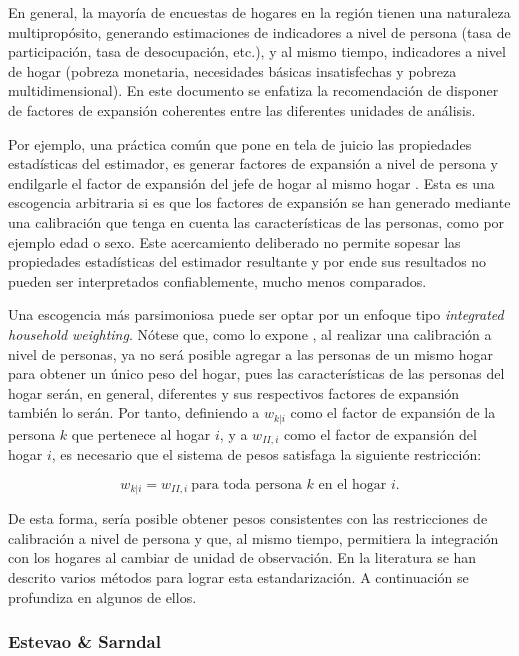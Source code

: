 \documentclass[
  12pt,
  spanish,
]{book}
\begin{document}
En general, la mayoría de encuestas de hogares en la región tienen una naturaleza multipropósito, generando estimaciones de indicadores a nivel de persona (tasa de participación, tasa de desocupación, etc.), y al mismo tiempo, indicadores a nivel de hogar (pobreza monetaria, necesidades básicas insatisfechas y pobreza multidimensional). En este documento se enfatiza la recomendación de disponer de factores de expansión coherentes entre las diferentes unidades de análisis.

Por ejemplo, una práctica común que pone en tela de juicio las propiedades estadísticas del estimador, es generar factores de expansión a nivel de persona y endilgarle el factor de expansión del jefe de hogar al mismo hogar \citep{Alexander_1987}. Esta es una escogencia arbitraria si es que los factores de expansión se han generado mediante una calibración que tenga en cuenta las características de las personas, como por ejemplo edad o sexo. Este acercamiento deliberado no permite sopesar las propiedades estadísticas del estimador resultante y por ende sus resultados no pueden ser interpretados confiablemente, mucho menos comparados.

Una escogencia más parsimoniosa puede ser optar por un enfoque tipo \emph{integrated household weighting}. Nótese que, como lo expone \citet{Heldal_1992}, al realizar una calibración a nivel de personas, ya no será posible agregar a las personas de un mismo hogar para obtener un único peso del hogar, pues las características de las personas del hogar serán, en general, diferentes y sus respectivos factores de expansión también lo serán. Por tanto, definiendo a \(w_{k|i}\) como el factor de expansión de la persona \(k\) que pertenece al hogar \(i\), y a \(w_{II,i}\) como el factor de expansión del hogar \(i\), es necesario que el sistema de pesos satisfaga la siguiente restricción:

\[
w_{k|i}=w_{II,i}\ \text{para toda persona $k$ en el hogar $i$}.
\]

De esta forma, sería posible obtener pesos consistentes con las restricciones de calibración a nivel de persona y que, al mismo tiempo, permitiera la integración con los hogares al cambiar de unidad de observación. En la literatura se han descrito varios métodos para lograr esta estandarización. A continuación se profundiza en algunos de ellos.

\hypertarget{estevao-sarndal}{%
\subsubsection{Estevao \& Sarndal}\label{estevao-sarndal}}
\end{document}
